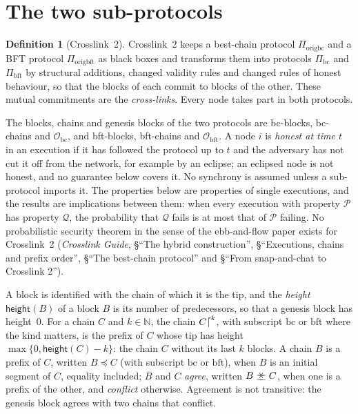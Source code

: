 \documentclass[11pt,a4paper]{article}
\theoremstyle{definition}
\newtheorem{definition}[theorem]{Definition}
\newcommand{\N}{\mathbb{N}}
\newcommand{\bc}{\mathrm{bc}}
\newcommand{\bft}{\mathrm{bft}}
\newcommand{\Origin}{\mathcal{O}}
\newcommand{\Obc}{\Origin_{\bc}}
\newcommand{\Obft}{\Origin_{\bft}}
\newcommand{\agrees}{\mathrel{\preceq\mkern-9mu\succeq}}
\newcommand{\Piorigbc}{\Pi_{\mathrm{origbc}}}
\newcommand{\Piorigbft}{\Pi_{\mathrm{origbft}}}
\newcommand{\Pibc}{\Pi_{\bc}}
\newcommand{\Pibft}{\Pi_{\bft}}
\begin{document}
\section{The two sub-protocols}\label{sec:sub}

\begin{definition}[Crosslink~2]\label{def:crosslink}
Crosslink~2 keeps a best-chain protocol $\Piorigbc$ and a BFT protocol
$\Piorigbft$ as black boxes and transforms them into protocols $\Pibc$ and
$\Pibft$ by structural additions, changed validity rules and changed rules of
honest behaviour, so that the blocks of each commit to blocks of the other.
These mutual commitments are the \emph{cross-links}. Every node takes part in
both protocols.
\end{definition}

The blocks, chains and genesis blocks of the two protocols are bc-blocks,
bc-chains and $\Obc$, and bft-blocks, bft-chains and $\Obft$. A node $i$ is
\emph{honest at time $t$} in an execution if it has followed the protocol up
to $t$ and the adversary has not cut it off from the network, for example by
an eclipse; an eclipsed node is not honest, and no guarantee below covers
it. No synchrony is assumed unless a sub-protocol imports it. The properties
below are properties of single executions, and the results are implications
between them: when every execution with property $\mathcal{P}$ has property
$\mathcal{Q}$, the probability that $\mathcal{Q}$ fails is at most that of
$\mathcal{P}$ failing. No probabilistic security theorem in the sense of the
ebb-and-flow paper exists for Crosslink~2 (\emph{Crosslink Guide}, \S``The
hybrid construction'', \S``Executions, chains and prefix order'', \S``The
best-chain protocol'' and \S``From snap-and-chat to Crosslink 2'').

A block is identified with the chain of which it is the tip, and the
\emph{height} $\mathsf{height}(B)$ of a block $B$ is its number of
predecessors, so that a genesis block has height~$0$. For a chain $C$ and
$k \in \N$, the chain $C\trunc{k}$, with subscript $\bc$ or $\bft$ where the
kind matters, is the prefix of $C$ whose tip has height
$\max\{0, \mathsf{height}(C) - k\}$: the chain $C$ without its last $k$
blocks. A chain $B$ is a prefix of $C$, written $B \preceq C$ (with subscript
$\bc$ or $\bft$), when $B$ is an initial segment of $C$, equality included;
$B$ and $C$ \emph{agree}, written $B \agrees C$, when one is a prefix of the
other, and \emph{conflict} otherwise. Agreement is not transitive: the
genesis block agrees with two chains that conflict.
\end{document}

